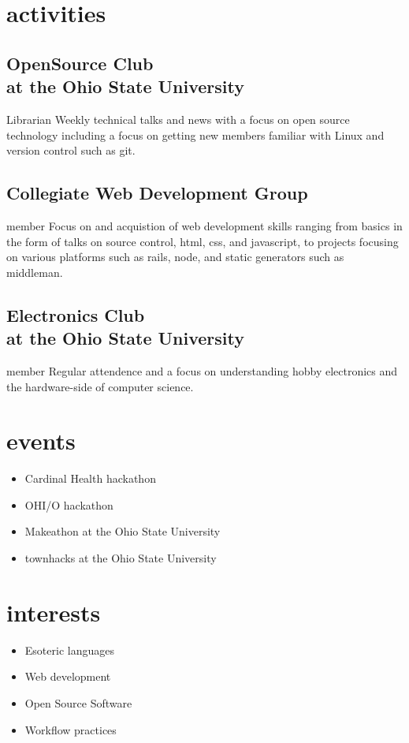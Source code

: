 \documentclass[letterpaper]{cv}
\begin{document}
	\section{activities}
		\subsection{OpenSource Club\\ at the Ohio State University}{Librarian}
			Weekly technical talks and news with a focus on open source technology including a focus on getting new members familiar with Linux and version control such as git.

		\subsection{Collegiate Web Development Group}{member}
			Focus on and acquistion of web development skills ranging from basics in the form of talks on source control, html, css, and javascript, to projects focusing on various platforms such as rails, node, and static generators such as middleman.

		\subsection{Electronics Club\\ at the Ohio State University}{member}
			Regular attendence and a focus on understanding hobby electronics and the hardware-side of computer science.

	\section{events}
		\begin{itemize}
			\item{Cardinal Health hackathon}
			\item{OHI/O hackathon}
			\item{Makeathon at the Ohio State University}
			\item{townhacks at the Ohio State University}
		\end{itemize}

	\section{interests}
	\begin{itemize}
		\item Esoteric languages
		\item Web development
		\item Open Source Software
		\item Workflow practices
	\end{itemize}
		
\end{document}
